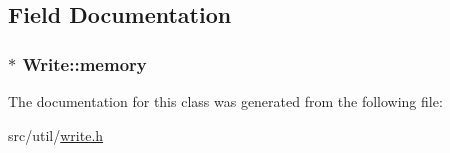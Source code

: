 \subsection{Field Documentation}
\hypertarget{class_write_ac6d11e0db370053dda204d7de9f6a605}{}
\subsubsection[{memory}]{$\ast$ Write\+::memory\hspace{0.3cm}{\ttfamily [private]}}\label{class_write_ac6d11e0db370053dda204d7de9f6a605}


The documentation for this class was generated from the following file\+:\begin{DoxyCompactItemize}
\item 
src/util/\hyperlink{write_8h}{write.\+h}\end{DoxyCompactItemize}
